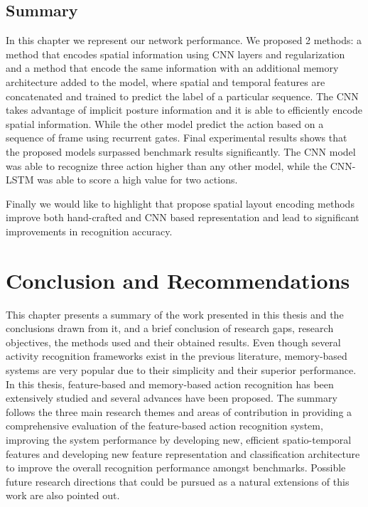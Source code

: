 \section{Summary}
In this chapter we represent our network performance. We proposed 2 methods: a method that encodes spatial information using CNN layers and regularization and a method that encode the same information with an additional memory architecture added to the model, where spatial and temporal features are concatenated and trained to predict the label of a particular sequence.
The CNN takes advantage of implicit posture information and it is able to efficiently encode spatial information. While the other model predict the action based on a sequence of frame using recurrent gates.
Final experimental results shows that the proposed models surpassed benchmark results significantly. The CNN model was able to recognize three action higher than any other model, while the CNN-LSTM was able to score a high value for two actions.

Finally we would like to highlight that propose spatial layout encoding methods improve both hand-crafted and CNN based representation and lead to significant improvements in recognition accuracy.

\chapter{Conclusion and Recommendations}

This chapter presents a summary of the work presented in this thesis and the conclusions drawn from it, and a brief conclusion of research gaps, research objectives, the methods used and their obtained results. Even though several activity recognition frameworks exist in the previous literature, memory-based systems are very popular due to their simplicity and their superior performance. In this thesis, feature-based and memory-based action recognition has been extensively studied and several advances have been proposed. The summary follows the three main research themes and areas of contribution in providing a comprehensive evaluation of the feature-based action recognition system, improving the system performance by developing new, efficient spatio-temporal features and developing new feature representation and classification architecture to improve the overall recognition performance amongst benchmarks. Possible future research directions that could be pursued as a natural extensions of this work are also pointed out. 

